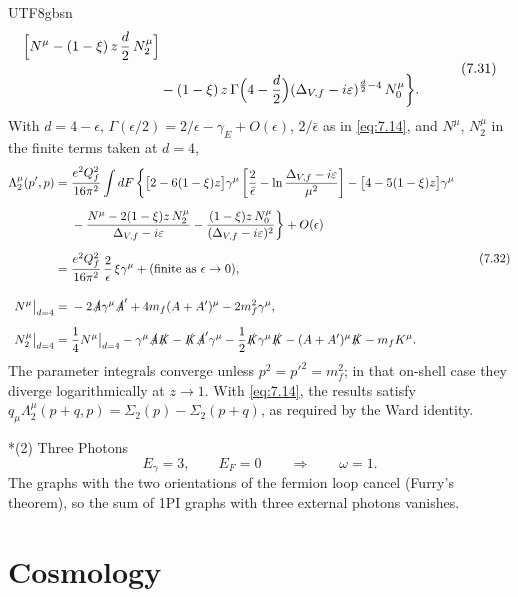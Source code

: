 \documentclass[11pt,a4paper,oneside]{report}
\makeatletter
\newcommand\topic{\@startsection{paragraph}{4}{\z@}{-1.7ex plus -.3ex}{.5ex}{\normalfont\normalsize\bfseries\itshape\boldmath}*}
\makeatother
\begin{document}
\begin{CJK*}{UTF8}{gbsn}
\begin{equation*}
\begin{aligned}
\Bigl[N^\mu-(1-\xi)\,z\,\frac d2\,N_2^\mu\Bigr]\\[6pt]
&-(1-\xi)\,z\,\Gamma\Bigl(4-\frac d2\Bigr)(\Delta_{V,f}-i\varepsilon)^{\frac d2-4}\,N_0^\mu\biggr\}.
\end{aligned}
\tag{7.31}\label{eq:7.31}
\end{equation*}
With $d=4-\epsilon$, $\Gamma(\epsilon/2)=2/\epsilon-\gamma_E+O(\epsilon)$, $2/\bar\epsilon$ as in \eqref{eq:7.14}, and $N^\mu$, $N_2^\mu$ in the finite terms taken at $d=4$,
\begin{equation*}
{\displaystyle 
\begin{aligned}
\Lambda_2^\mu(p',p)={}&\frac{e^2Q_f^2}{16\pi^2}\int dF\,\biggl\{
\bigl[2-6(1-\xi)z\bigr]\gamma^\mu\left[\frac2{\bar\epsilon}-\ln\frac{\Delta_{V,f}-i\varepsilon}{\mu^2}\right]
-\bigl[4-5(1-\xi)z\bigr]\gamma^\mu\\[6pt]
&-\frac{N^\mu-2(1-\xi)z\,N_2^\mu}{\Delta_{V,f}-i\varepsilon}
-\frac{(1-\xi)z\,N_0^\mu}{(\Delta_{V,f}-i\varepsilon)^2}\biggr\}+O(\epsilon)\\[6pt]
={}&\frac{e^2Q_f^2}{16\pi^2}\,\frac2\epsilon\,\xi\gamma^\mu+(\text{finite as }\epsilon\to0),\\[10pt]
N^\mu\big|_{d=4}={}&-2\slashed{A}\gamma^\mu\slashed{A}'+4m_f(A+A')^\mu-2m_f^2\gamma^\mu,\\[6pt]
N_2^\mu\big|_{d=4}={}&\frac14N^\mu\big|_{d=4}-\gamma^\mu\slashed{A}\slashed{K}-\slashed{K}\slashed{A}'\gamma^\mu-\frac12\slashed{K}\gamma^\mu\slashed{K}-(A+A')^\mu\slashed{K}-m_fK^\mu .
\end{aligned}
}
\tag{7.32}\label{eq:7.32}
\end{equation*}
The parameter integrals converge unless $p^2=p'^2=m_f^2$; in that on-shell case they diverge logarithmically at $z\to1$. With \eqref{eq:7.14}, the results satisfy $q_\mu\Lambda_2^\mu(p+q,p)=\Sigma_2(p)-\Sigma_2(p+q)$, as required by the Ward identity.

\topic{(2) Three Photons}
\begin{equation*}
E_\gamma=3,\qquad E_F=0\qquad\Longrightarrow\qquad\omega=1 .
\tag{7.33}\label{eq:7.33}
\end{equation*}
The graphs with the two orientations of the fermion loop cancel (Furry's theorem), so the sum of 1PI graphs with three external photons vanishes.

\setcounter{chapter}{7}
\chapter{Cosmology}\label{book-chapter-8}\label{qft-ch8}


\end{CJK*}
\end{document}
